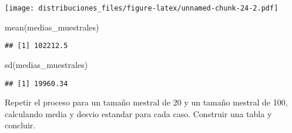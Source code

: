 \documentclass[
]{article}
\newenvironment{Shaded}{\begin{snugshade}}{\end{snugshade}}
\newcommand{\AttributeTok}[1]{\textcolor[rgb]{0.77,0.63,0.00}{#1}}
\newcommand{\DecValTok}[1]{\textcolor[rgb]{0.00,0.00,0.81}{#1}}
\newcommand{\FunctionTok}[1]{\textcolor[rgb]{0.00,0.00,0.00}{#1}}
\newcommand{\NormalTok}[1]{#1}
\newcommand{\OtherTok}[1]{\textcolor[rgb]{0.56,0.35,0.01}{#1}}
\newcommand{\SpecialCharTok}[1]{\textcolor[rgb]{0.00,0.00,0.00}{#1}}
\newcommand{\StringTok}[1]{\textcolor[rgb]{0.31,0.60,0.02}{#1}}
\begin{document}
\begin{Shaded}
\end{Shaded}

\texttt{[image: distribuciones\_files/figure-latex/unnamed-chunk-24-2.pdf]}

\begin{Shaded}
\begin{Highlighting}[]
\FunctionTok{mean}\NormalTok{(medias\_muestrales)}
\end{Highlighting}
\end{Shaded}

\begin{verbatim}
## [1] 102212.5
\end{verbatim}

\begin{Shaded}
\begin{Highlighting}[]
\FunctionTok{sd}\NormalTok{(medias\_muestrales)}
\end{Highlighting}
\end{Shaded}

\begin{verbatim}
## [1] 19960.34
\end{verbatim}

Repetir el proceso para un tamaño mestral de 20 y un tamaño mestral de
100, calculando media y desvio estandar para cada caso. Construir una
tabla y concluir.
\end{document}
